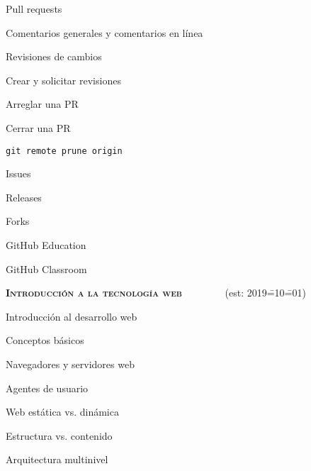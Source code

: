 \begin{longenum}
\begin{longenum}
\begin{longenum}
            \item Pull requests
            \begin{longenum}
                \item Comentarios generales y comentarios en línea
                \item Revisiones de cambios
                \begin{longenum}
                    \item Crear y solicitar revisiones
                \end{longenum}
                \item Arreglar una PR
                \item Cerrar una PR
                \begin{longenum}
                    \item \texttt{git remote prune origin}
                \end{longenum}
            \end{longenum}
            \item Issues
            \item Releases
            \item Forks
            \item GitHub Education
            \begin{longenum}
                \item GitHub Classroom
            \end{longenum}
        \end{longenum}
    \end{longenum}
    \item \textbf{\textsc{Introducción a la tecnología web}} \ \ \ \ \ \ \ \ (est: 2019\==10\==01)
    \begin{longenum}
        \item Introducción al desarrollo web
        \begin{longenum}
            \item Conceptos básicos
            \begin{longenum}
                \item Navegadores y servidores web
                \item Agentes de usuario
                \item Web estática vs. dinámica
                \item Estructura vs. contenido
                \item Arquitectura multinivel

\end{longenum}
\end{longenum}
\end{longenum}
\end{longenum}
